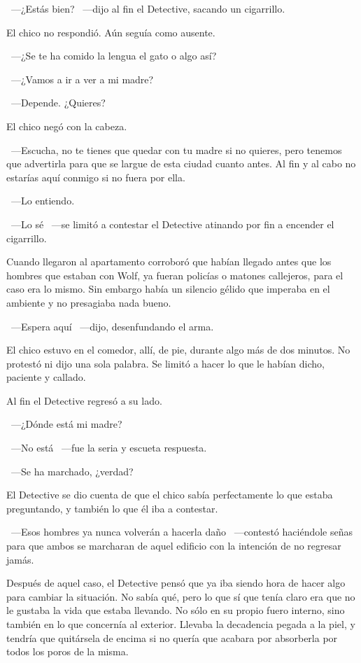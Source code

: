~---¿Estás bien? ~---dijo al fin el Detective, sacando un cigarrillo.

El chico no respondió. Aún seguía como ausente.

~---¿Se te ha comido la lengua el gato o algo así?

~---¿Vamos a ir a ver a mi madre?

~---Depende. ¿Quieres?

El chico negó con la cabeza.

~---Escucha, no te tienes que quedar con tu madre si no quieres, pero tenemos que advertirla para que se largue de esta ciudad cuanto antes. Al fin y al cabo no estarías aquí conmigo si no fuera por ella.

~---Lo entiendo.

~---Lo sé ~---se limitó a contestar el Detective atinando por fin a encender el cigarrillo.

Cuando llegaron al apartamento corroboró que habían llegado antes que los hombres que estaban con Wolf, ya fueran policías o matones callejeros, para el caso era lo mismo. Sin embargo había un silencio gélido que imperaba en el ambiente y no presagiaba nada bueno.

~---Espera aquí ~---dijo, desenfundando el arma.

El chico estuvo en el comedor, allí, de pie, durante algo más de dos minutos. No protestó ni dijo una sola palabra. Se limitó a hacer lo que le habían dicho, paciente y callado.

Al fin el Detective regresó a su lado.

~---¿Dónde está mi madre?

~---No está ~---fue la seria y escueta respuesta.

~---Se ha marchado, ¿verdad?

El Detective se dio cuenta de que el chico sabía perfectamente lo que estaba preguntando, y también lo que él iba a contestar.

~---Esos hombres ya nunca volverán a hacerla daño ~---contestó haciéndole señas para que ambos se marcharan de aquel edificio con la intención de no regresar jamás.

\parbreak
Después de aquel caso, el Detective pensó que ya iba siendo hora de hacer algo para cambiar la situación. No sabía qué, pero lo que sí que tenía claro era que no le gustaba la vida que estaba llevando. No sólo en su propio fuero interno, sino también en lo que concernía al exterior. Llevaba la decadencia pegada a la piel, y tendría que quitársela de encima si no quería que acabara por absorberla por todos los poros de la misma.

